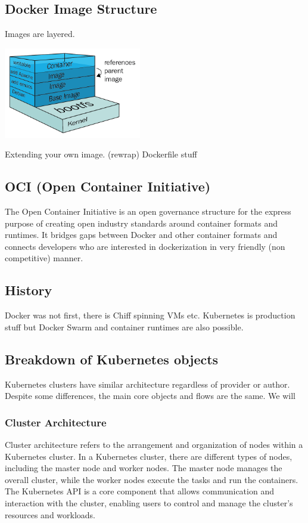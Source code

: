 \documentclass{article}
\begin{document}
\subsection{Docker Image Structure}
Images are layered.
\begin{center}
  \includegraphics[width=0.450\textwidth]{000_Image_structure.png}
\end{center}
Extending your own image. (rewrap)
Dockerfile stuff
\subsection{OCI (Open Container Initiative)}
The Open Container Initiative is an open governance structure for the express purpose of creating open industry standards around container formats and runtimes. It bridges gaps between Docker and other container formats and connects developers who are interested in dockerization in very friendly (non competitive) manner. 
\subsection{History}
Docker was not first, there is Chiff spinning VMs etc. Kubernetes is production stuff but Docker Swarm and container runtimes are also possible.
\subsection{Breakdown of Kubernetes objects}
Kubernetes clusters have similar architecture regardless of provider or author. Despite some differences, the main core objects and flows are the same. We will  
\subsubsection*{Cluster Architecture}
Cluster architecture refers to the arrangement and organization of nodes within a Kubernetes cluster. In a Kubernetes cluster, there are different types of nodes, including the master node and worker nodes. The master node manages the overall cluster, while the worker nodes execute the tasks and run the containers. The Kubernetes API is a core component that allows communication and interaction with the cluster, enabling users to control and manage the cluster's resources and workloads.
\end{document}
